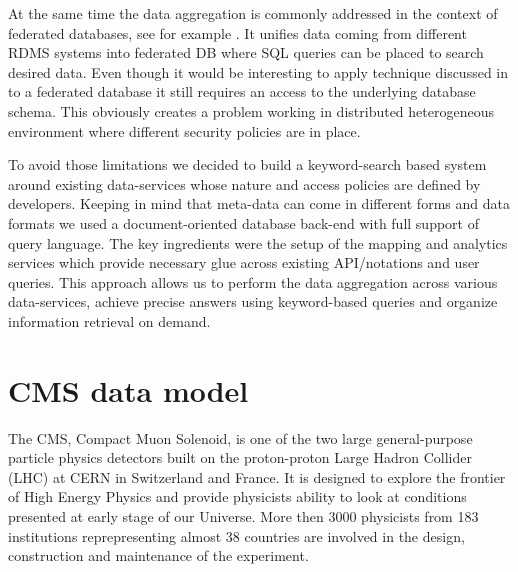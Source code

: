 \documentclass[a4paper]{jpconf}
\begin{document}
At the same time the data aggregation is commonly addressed in the context of
federated databases, see for example \cite{FedDB}. It unifies data coming 
from different RDMS systems into federated DB where SQL queries can be placed to 
search desired data. Even though it would be interesting to apply technique 
discussed in \cite{DBS-QL} to a federated database it still requires 
an access to the underlying database schema. This obviously creates a problem
working in distributed heterogeneous environment where different security policies
are in place.

To avoid those limitations we decided to build a keyword-search based system around
existing data-services whose nature and access policies are defined by developers.
Keeping in mind that meta-data can come in different forms and data formats
we used a document-oriented database back-end with full support of query language.
The key ingredients were the setup of the mapping and analytics services which provide
necessary glue across existing API/notations and user queries. This approach 
allows us to perform the data aggregation across various data-services, achieve
precise answers using keyword-based queries
and organize information retrieval on demand.

\section{CMS data model\label{DataModel}}
The CMS, Compact Muon Solenoid, \cite{CMS} 
is one of the two large general-purpose particle physics detectors built on 
the proton-proton Large Hadron Collider (LHC) at CERN in Switzerland and France. 
It is designed to explore the frontier of High Energy Physics and provide physicists
ability to look at conditions presented at early stage of our Universe.
More then 3000 physicists from 183 institutions reprepresenting almost 
38 countries are involved in the design, construction and maintenance of the experiment.
\end{document}
